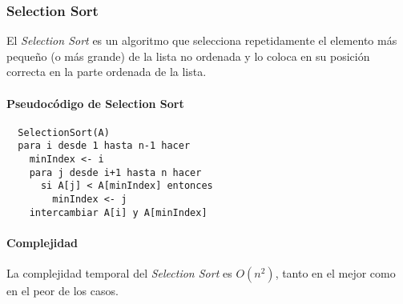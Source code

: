 \subsubsection{Selection Sort}

El \textit{Selection Sort} es un algoritmo que selecciona repetidamente el elemento más pequeño (o más grande) de la lista no ordenada y lo coloca en su posición correcta en la parte ordenada de la lista.

\paragraph{Pseudocódigo de Selection Sort}

\begin{verbatim}
  SelectionSort(A)
  para i desde 1 hasta n-1 hacer
    minIndex <- i
    para j desde i+1 hasta n hacer
      si A[j] < A[minIndex] entonces
        minIndex <- j
    intercambiar A[i] y A[minIndex]
\end{verbatim}

\paragraph{Complejidad}

La complejidad temporal del \textit{Selection Sort} es \( O(n^2) \), tanto en el mejor como en el peor de los casos.